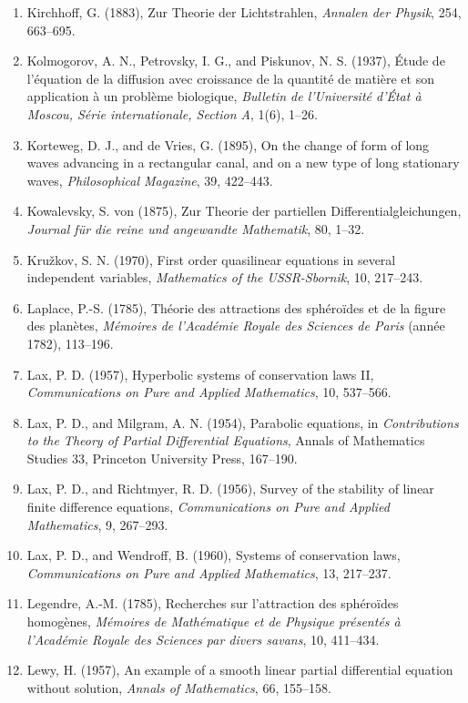 \documentclass[11pt,a4paper]{article}
\numberwithin{equation}{section}
\theoremstyle{definition}
\begin{document}
\begin{enumerate}
\item Kirchhoff, G. (1883), Zur Theorie der Lichtstrahlen, \emph{Annalen der Physik}, 254, 663--695.
\item Kolmogorov, A. N., Petrovsky, I. G., and Piskunov, N. S. (1937), \'Etude de l'\'equation de la diffusion avec croissance de la quantit\'e de mati\`ere et son application \`a un probl\`eme biologique, \emph{Bulletin de l'Universit\'e d'\'Etat \`a Moscou, S\'erie internationale, Section A}, 1(6), 1--26.
\item Korteweg, D. J., and de Vries, G. (1895), On the change of form of long waves advancing in a rectangular canal, and on a new type of long stationary waves, \emph{Philosophical Magazine}, 39, 422--443.
\item Kowalevsky, S. von (1875), Zur Theorie der partiellen Differentialgleichungen, \emph{Journal f\"ur die reine und angewandte Mathematik}, 80, 1--32.
\item Kru\v{z}kov, S. N. (1970), First order quasilinear equations in several independent variables, \emph{Mathematics of the USSR-Sbornik}, 10, 217--243.
\item Laplace, P.-S. (1785), Th\'eorie des attractions des sph\'ero\"ides et de la figure des plan\`etes, \emph{M\'emoires de l'Acad\'emie Royale des Sciences de Paris} (ann\'ee 1782), 113--196.
\item Lax, P. D. (1957), Hyperbolic systems of conservation laws II, \emph{Communications on Pure and Applied Mathematics}, 10, 537--566.
\item Lax, P. D., and Milgram, A. N. (1954), Parabolic equations, in \emph{Contributions to the Theory of Partial Differential Equations}, Annals of Mathematics Studies 33, Princeton University Press, 167--190.
\item Lax, P. D., and Richtmyer, R. D. (1956), Survey of the stability of linear finite difference equations, \emph{Communications on Pure and Applied Mathematics}, 9, 267--293.
\item Lax, P. D., and Wendroff, B. (1960), Systems of conservation laws, \emph{Communications on Pure and Applied Mathematics}, 13, 217--237.
\item Legendre, A.-M. (1785), Recherches sur l'attraction des sph\'ero\"ides homog\`enes, \emph{M\'emoires de Math\'ematique et de Physique pr\'esent\'es \`a l'Acad\'emie Royale des Sciences par divers savans}, 10, 411--434.
\item Lewy, H. (1957), An example of a smooth linear partial differential equation without solution, \emph{Annals of Mathematics}, 66, 155--158.

\end{enumerate}
\end{document}
